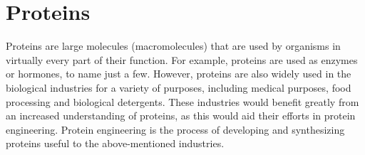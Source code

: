 
\section{Proteins}
Proteins are large molecules (macromolecules) that are used by organisms in virtually every part of their function. For example, proteins are used as enzymes or hormones, to name just a few. However, proteins are also widely used in the biological industries for a variety of purposes, including medical purposes, food processing and biological detergents. These industries would benefit greatly from an increased understanding of proteins, as this would aid their efforts in protein engineering. Protein engineering is the process of developing and synthesizing proteins useful to the above-mentioned industries.


